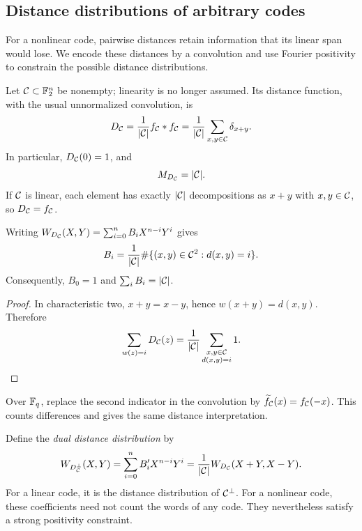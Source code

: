 \subsection{Distance distributions of arbitrary codes}

For a nonlinear code, pairwise distances retain information that its linear
span would lose. We encode these distances by a convolution and use Fourier
positivity to constrain the possible distance distributions.

Let $\mathcal{C}\subset\mathbb{F}_2^n$ be nonempty; linearity is no longer assumed.
Its distance function, with the usual unnormalized convolution, is
\begin{equation}
\label{eq-expression-function-distance}
 D_{\mathcal{C}}=\frac1{|\mathcal{C}|}f_{\mathcal{C}}*f_{\mathcal{C}}
       =\frac1{|\mathcal{C}|}\sum_{x,y\in\mathcal{C}}\delta_{x+y}.
\end{equation}
In particular, $D_{\mathcal{C}}(0)=1$, and
\begin{equation}
\label{eq-val-average-dual-function}
 M_{D_{\mathcal{C}}}=|\mathcal{C}|.
\end{equation}
If $\mathcal{C}$ is linear, each element has exactly $|\mathcal{C}|$ decompositions as
$x+y$ with $x,y\in\mathcal{C}$, so $D_{\mathcal{C}}=f_{\mathcal{C}}$.


\begin{prop}
\label{prop-repartition-distance-dualite}
Writing $W_{D_{\mathcal{C}}}(X,Y)=\sum_{i=0}^n B_iX^{n-i}Y^i$ gives
\[
 B_i=\frac1{|\mathcal{C}|}\#\{(x,y)\in\mathcal{C}^2:d(x,y)=i\}.
\]
Consequently, $B_0=1$ and $\sum_iB_i=|\mathcal{C}|$.
\end{prop}
\begin{proof}
In characteristic two, $x+y=x-y$, hence $w(x+y)=d(x,y)$. Therefore
\begin{equation}
\label{eq-repartition-distance-resulat-intermediaire}
 \sum_{w(z)=i}D_{\mathcal{C}}(z)=\frac1{|\mathcal{C}|}
          \sum_{\substack{x,y\in\mathcal{C}\\d(x,y)=i}}1.
\end{equation}
\end{proof}
Over $\mathbb{F}_q$, replace the second indicator in the convolution by
$\widetilde f_{\mathcal{C}}(x)=f_{\mathcal{C}}(-x)$. This counts differences and gives the
same distance interpretation.

Define the \emph{dual distance distribution} by
\begin{equation}
\label{eq-defn-repartition-distance-duale}
 W_{D_{\mathcal{C}}^\bot}(X,Y)=\sum_{i=0}^n B'_iX^{n-i}Y^i
 =\frac1{|\mathcal{C}|}W_{D_{\mathcal{C}}}(X+Y,X-Y).
\end{equation}
For a linear code, it is the distance distribution of $\mathcal{C}^\bot$.
For a nonlinear code, these coefficients need not count the words of
any code. They nevertheless satisfy a strong positivity constraint.

